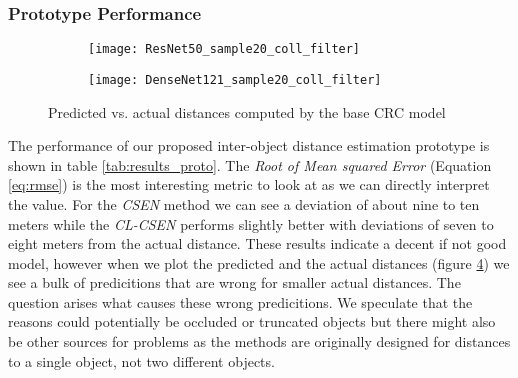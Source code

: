 \documentclass[a4paper, 11pt]{article}
\begin{document}
\begin{multicols}{2}
\subsubsection{Prototype Performance}
\begin{flushleft}
\begin{figure}[H]
\centering
\begin{subfigure}[c]{.5\textwidth}
\centering
\texttt{[image: ResNet50\_sample20\_coll\_filter]}
\label{fig:coll_filter_resnet30}
\end{subfigure}
\end{figure}
\begin{figure}[H]
\ContinuedFloat\centering
\begin{subfigure}[c]{.5\textwidth}
\centering
\texttt{[image: DenseNet121\_sample20\_coll\_filter]}
\label{fig:coll_filter_resnet30}
\end{subfigure}
\caption{Predicted vs. actual distances computed by the base CRC model \cite{ahishali2021representation}}
\label{fig:coll_filter_proto}
\end{figure}
The performance of our proposed inter-object distance estimation prototype is shown in table \ref{tab:results_proto}. The \textit{Root of Mean squared Error} (Equation \ref{eq:rmse}) is the most interesting metric to look at as we can directly interpret the value. For the \textit{CSEN} method we can see a deviation of about nine to ten meters while the \textit{CL-CSEN} performs slightly better with deviations of seven to eight meters from the actual distance. These results indicate a decent if not good model, however when we plot the predicted and the actual distances (figure \ref{fig:coll_filter_proto}) we see a bulk of predicitions that are wrong for smaller actual distances. The question arises what causes these wrong predicitions. We speculate that the reasons could potentially be occluded or truncated objects but there might also be other sources for problems as the methods are originally designed for distances to a single object, not two different objects.
\end{flushleft}


\end{multicols}
\end{document}
